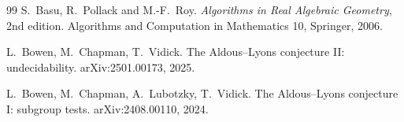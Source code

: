 \begin{thebibliography}{99}
S.~Basu, R.~Pollack and M.-F.~Roy.
\newblock \emph{Algorithms in Real Algebraic Geometry}, 2nd edition.
\newblock Algorithms and Computation in Mathematics 10, Springer, 2006.

L.~Bowen, M.~Chapman, T.~Vidick.
\newblock The Aldous--Lyons conjecture II: undecidability.
\newblock arXiv:2501.00173, 2025.

L.~Bowen, M.~Chapman, A.~Lubotzky, T.~Vidick.
\newblock The Aldous--Lyons conjecture I: subgroup tests.
\newblock arXiv:2408.00110, 2024.

\end{thebibliography}
